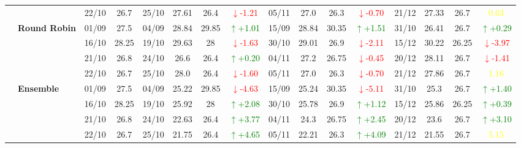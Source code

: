 \documentclass{ieeeaccess}
\begin{document}
{\begin{longtable}{llcc|cccc|cccc|cccc}
&
& 22/10 & 26.7 & 25/10 & 27.61 & 26.4 & \textcolor{red}{\(\downarrow\)-1.21} & 05/11 & 27.0 & 26.3 & \textcolor{red}{\(\downarrow\)-0.70} & 21/12 & 27.33 & 26.7 & \textcolor{yellow}{0.63} \\
\cmidrule(lr){2-16}


& \textbf{Round Robin}
& 01/09 & 27.5 & 04/09 & 28.84 & 29.85 & \textcolor{green}{\(\uparrow\)+1.01} & 15/09 & 28.84 & 30.35 & \textcolor{green}{\(\uparrow\)+1.51} & 31/10 & 26.41 & 26.7 & \textcolor{green}{\(\uparrow\)+0.29} \\

& 
& 16/10 & 28.25 & 19/10 & 29.63 & 28 & \textcolor{red}{\(\downarrow\)-1.63} & 30/10 & 29.01 & 26.9 & \textcolor{red}{\(\downarrow\)-2.11} & 15/12 & 30.22 & 26.25 & \textcolor{red}{\(\downarrow\)-3.97} \\

& 
& 21/10 & 26.8 & 24/10 & 26.6 & 26.4 & \textcolor{green}{\(\uparrow\)+0.20} & 04/11 & 27.2 & 26.75 & \textcolor{red}{\(\downarrow\)-0.45} & 20/12 & 28.11 & 26.7 & \textcolor{red}{\(\downarrow\)-1.41} \\

&
& 22/10 & 26.7 & 25/10 & 28.0 & 26.4 & \textcolor{red}{\(\downarrow\)-1.60} & 05/11 & 27.0 & 26.3 & \textcolor{red}{\(\downarrow\)-0.70} & 21/12 & 27.86 & 26.7 & \textcolor{yellow}{1.16} \\
\cmidrule(lr){2-16}


& \textbf{Ensemble}
& 01/09 & 27.5 & 04/09 & 25.22 & 29.85& \textcolor{red}{\(\downarrow\)-4.63} & 15/09 & 25.24 & 30.35 & \textcolor{red}{\(\downarrow\)-5.11} & 31/10 & 25.3 & 26.7 & \textcolor{green}{\(\uparrow\)+1.40} \\

& 
& 16/10 & 28.25 & 19/10 & 25.92 & 28 & \textcolor{green}{\(\uparrow\)+2.08} & 30/10 & 25.78 & 26.9 & \textcolor{green}{\(\uparrow\)+1.12} & 15/12 & 25.86 & 26.25 & \textcolor{green}{\(\uparrow\)+0.39} \\

& 
& 21/10 & 26.8 & 24/10 & 22.63 & 26.4 & \textcolor{green}{\(\uparrow\)+3.77} & 04/11 & 24.3 & 26.75 & \textcolor{green}{\(\uparrow\)+2.45} & 20/12 & 23.6 & 26.7 & \textcolor{green}{\(\uparrow\)+3.10} \\

&
& 22/10 & 26.7 & 25/10 & 21.75 & 26.4 & \textcolor{green}{\(\uparrow\)+4.65} & 05/11 & 22.21 & 26.3 & \textcolor{green}{\(\uparrow\)+4.09} & 21/12 & 21.55 & 26.7 & \textcolor{yellow}{5.15} \\
\midrule







\end{longtable}}
\end{document}
